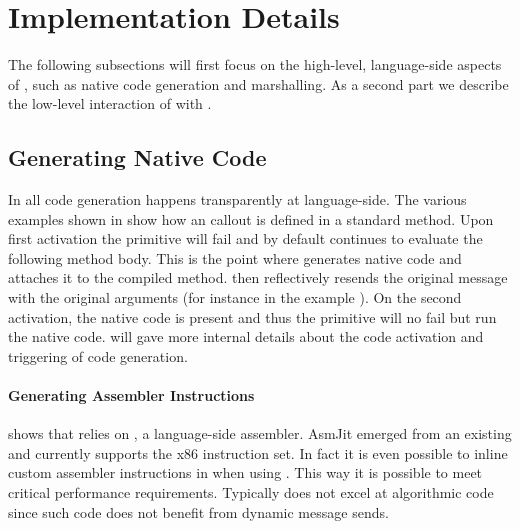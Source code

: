 \section{Implementation Details}
The following subsections will first focus on the high-level, language-side aspects of \NB, such as native code generation and marshalling.
As a second part we describe the low-level interaction of \NB with \B.

\subsection{Generating Native Code}

In \NB all code generation happens transparently at language-side.
The various examples shown in  show how an \FFI callout is defined in a standard method.
Upon first activation the \NB primitive will fail and by default continues to evaluate the following method body.
This is the point where \NB generates native code and attaches it to the compiled method.
\NB then reflectively resends the original message with the original arguments (for instance  in the example ).
On the second activation, the native code is present and thus the primitive will no fail but run the native code.
 will gave more internal details about the code activation and triggering of code generation.

\paragraph{Generating Assembler Instructions}

 shows that \NB relies on , a language-side assembler.
AsmJit emerged from an existing  and currently supports the x86 instruction set.
In fact it is even possible to inline custom assembler instructions in \PH when using \NB.
This way it is possible to meet critical performance requirements.
Typically \PH does not excel at algorithmic code since such code does not benefit from dynamic message sends.

